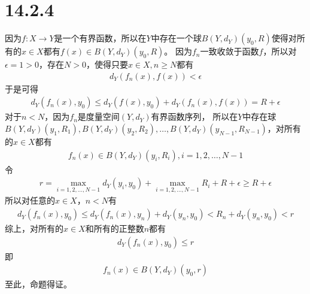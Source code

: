 \documentclass{article}
\begin{document}
\section*{14.2.4}

因为$f: X \to Y$是一个有界函数，所以在$Y$中存在一个球$B(Y,d_Y)(y_0, R)$使得对所有的$x \in X$都有$f(x) \in B(Y,d_Y)(y_0, R)$。
因为$f_n$一致收敛于函数$f$，所以对$\epsilon = 1 > 0$，存在$N > 0$，使得只要$x \in X, n \geq N$都有
\begin{align*}
  d_Y(f_n(x), f(x)) < \epsilon
\end{align*}
于是可得
\begin{align*}
  d_Y(f_n(x), y_0) \leq d_Y(f(x), y_0) + d_Y(f_n(x), f(x)) = R + \epsilon
\end{align*}
对于$n < N$，因为$f_n$是度量空间$(Y, d_Y)$有界函数序列，
所以在$Y$中存在球$B(Y, d_Y)(y_1, R_1), B(Y, d_Y)(y_2, R_2), \dots, B(Y, d_Y)(y_{N - 1}, R_{N - 1})$，对所有的$x \in X$都有
\begin{align*}
  f_n(x) \in B(Y, d_Y)(y_i, R_i), i = 1, 2, \dots, N - 1
\end{align*}
令
\begin{align*}
  r = \max\limits_{i = 1, 2, \dots, N - 1} d_Y(y_i, y_0) + \max\limits_{i = 1, 2, \dots, N - 1} R_i + R + \epsilon \geq R + \epsilon
\end{align*}
所以对任意的$x \in X$，$n < N$有
\begin{align*}
  d_Y(f_n(x), y_0) \leq d_Y(f_n(x), y_n) + d_Y(y_n, y_0) < R_n + d_Y(y_n, y_0) < r
\end{align*}
综上，对所有的$x \in X$和所有的正整数$n$都有
\begin{align*}
  d_Y(f_n(x), y_0) \leq r
\end{align*}
即
\begin{align*}
  f_n(x) \in B(Y, d_Y)(y_0, r)
\end{align*}
至此，命题得证。
\end{document}
